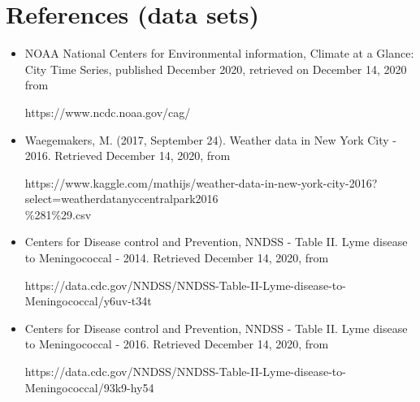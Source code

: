 \documentclass[fontsize=11pt]{article}
\begin{document}
\section*{References (data sets)}
\begin{itemize}
 \item NOAA National Centers for Environmental information, Climate at a Glance: City Time Series, published December 2020, retrieved on December 14, 2020 from 
 
 https://www.ncdc.noaa.gov/cag/
 
 \item Waegemakers, M. (2017, September 24). Weather data in New York City - 2016. Retrieved December 14, 2020, from
 
 
 https://www.kaggle.com/mathijs/weather-data-in-new-york-city-2016?select=weatherdatanyccentralpark2016\\\%281\%29.csv
 
 
 \item Centers for Disease control and Prevention, NNDSS - Table II. Lyme disease to Meningococcal - 2014. Retrieved December 14, 2020, from 
 
 https://data.cdc.gov/NNDSS/NNDSS-Table-II-Lyme-disease-to-Meningococcal/y6uv-t34t
 
 \item Centers for Disease control and Prevention, NNDSS - Table II. Lyme disease to Meningococcal - 2016. Retrieved December 14, 2020, from 
 
https://data.cdc.gov/NNDSS/NNDSS-Table-II-Lyme-disease-to-Meningococcal/93k9-hy54
\end{itemize}
\end{document}
